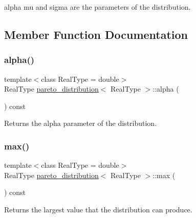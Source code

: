 {\ttfamily alpha} {\ttfamily mu} and {\ttfamily sigma} are the parameters of the distribution. 

\subsection{Member Function Documentation}
\mbox{\label{classpareto__distribution_a4e867e8f34f77a9953873987374fb5d0}} 
\subsubsection{\texorpdfstring{alpha()}{alpha()}}
{\footnotesize\ttfamily template$<$class Real\+Type  = double$>$ \\
Real\+Type \mbox{\hyperlink{classpareto__distribution}{pareto\+\_\+distribution}}$<$ Real\+Type $>$\+::alpha (\begin{DoxyParamCaption}{ }\end{DoxyParamCaption}) const\hspace{0.3cm}{\ttfamily [inline]}}



Returns the alpha parameter of the distribution. 

\mbox{\label{classpareto__distribution_a884ff35d4c1d1b5979e17c8eee41f397}} 
\subsubsection{\texorpdfstring{max()}{max()}}
{\footnotesize\ttfamily template$<$class Real\+Type  = double$>$ \\
Real\+Type \mbox{\hyperlink{classpareto__distribution}{pareto\+\_\+distribution}}$<$ Real\+Type $>$\+::max (\begin{DoxyParamCaption}{ }\end{DoxyParamCaption}) const\hspace{0.3cm}{\ttfamily [inline]}}



Returns the largest value that the distribution can produce. 

\mbox{\label{classpareto__distribution_a73ccdc7f9a3f3131d58627a94789ecfb}} 

